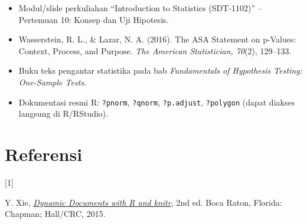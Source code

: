 \documentclass[
  indonesian,
  letterpaper,
]{book}
\newlength{\cslhangindent}
\newlength{\csllabelwidth}
\newenvironment{CSLReferences}[2] %
 {\begin{list}{}{%
  \setlength{\itemindent}{0pt}
  \setlength{\leftmargin}{0pt}
  \setlength{\parsep}{0pt}
  \ifodd #1
   \setlength{\leftmargin}{\cslhangindent}
   \setlength{\itemindent}{-1\cslhangindent}
  \fi
  \setlength{\itemsep}{#2\baselineskip}}}
 {\end{list}}
\newcommand{\CSLLeftMargin}[1]{\parbox[t]{\csllabelwidth}{\strut#1\strut}}
\newcommand{\CSLRightInline}[1]{\parbox[t]{\linewidth - \csllabelwidth}{\strut#1\strut}}
\providecommand{\tightlist}{%
  \setlength{\itemsep}{0pt}\setlength{\parskip}{0pt}}
\begin{document}
\begin{itemize}
\tightlist
\item
  Modul/slide perkuliahan ``Introduction to Statistics (SDT-1102)'' --
  Pertemuan 10: Konsep dan Uji Hipotesis.
\item
  Wasserstein, R. L., \& Lazar, N. A. (2016). The ASA Statement on
  p-Values: Context, Process, and Purpose. \emph{The American
  Statistician, 70}(2), 129--133.
\item
  Buku teks pengantar statistika pada bab \emph{Fundamentals of
  Hypothesis Testing: One-Sample Tests}.
\item
  Dokumentasi resmi R: \texttt{?pnorm}, \texttt{?qnorm},
  \texttt{?p.adjust}, \texttt{?polygon} (dapat diakses langsung di
  R/RStudio).
\end{itemize}


\chapter{}\label{section}


\chapter*{Referensi}\label{referensi}


\protect{}\label{refs}
\begin{CSLReferences}{0}{0}
\CSLLeftMargin{{[}1{]} }%
\CSLRightInline{Y. Xie, \emph{\href{http://yihui.name/knitr/}{Dynamic
Documents with {R} and knitr}}, 2nd ed. Boca Raton, Florida: Chapman;
Hall/CRC, 2015.}

\end{CSLReferences}


\backmatter
\end{document}
